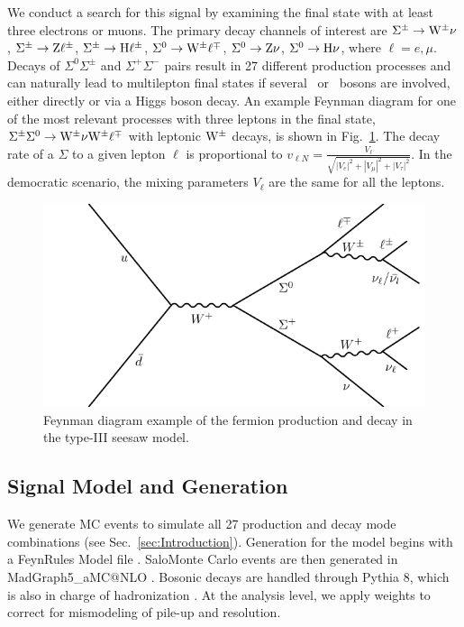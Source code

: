 We conduct a search for this signal by examining the final state with at least three electrons or muons. The primary decay channels of interest are $\Sigma^\pm \to \mathrm{W}^\pm \nu$, $\Sigma^\pm \to \mathrm{Z} \ell^\pm$, $\Sigma^\pm \to \mathrm{H} \ell^\pm$, $\Sigma^0 \to \mathrm{W}^\pm \ell^\mp$, $\Sigma^0 \to \mathrm{Z} \nu$, $\Sigma^0 \to \mathrm{H} \nu$, where $\ell = e, \mu$. Decays of $\Sigma^0 \Sigma^\pm$ and $\Sigma^+ \Sigma^-$ pairs result in 27 different production processes and can naturally lead to multilepton final states if several \PW\ or \Z\ bosons are involved, either directly or via a Higgs boson decay. An example Feynman diagram for one of the most relevant processes with three leptons in the final state, $\Sigma^\pm \Sigma^0 \to \mathrm{W}^\pm \nu \mathrm{W}^\pm \ell^\mp$ with leptonic $\mathrm{W}^\pm$ decays, is shown in Fig.~\ref{fig:SeesawDecay}.
The decay rate of a $\Sigma$ to a given lepton $\ell$ is proportional to $v_{\ell N} = \frac{V_\ell}{\sqrt{|V_e|^2 + |V_\mu|^2 + |V_\tau|^2}}$. In the democratic scenario, the mixing parameters $V_\ell$ are the same for all the leptons.

\begin{figure}
\begin{center}
	\includegraphics[width=.5\textwidth]{Introduction/Seesaw}
	\caption{Feynman diagram example of the fermion production and decay in the type-III seesaw model.
	\label{fig:SeesawDecay}}
\end{center}
\end{figure}


\subsection{Signal Model and Generation}
\label{sec:Samples/Signal}

We generate MC events to simulate all 27 production and decay mode combinations (see Sec.~\ref{sec:Introduction}). Generation for the model begins with a FeynRules Model file \cite{SeesawIII_Biggio}. SaloMonte Carlo events are then generated in MadGraph5\_aMC@NLO \cite{Alwall:2011uj}. Bosonic decays are handled through Pythia 8, which is also in charge of hadronization \cite{Sjostrand:2007gs}. At the analysis level, we apply weights to correct for mismodeling of pile-up and \MET resolution.

